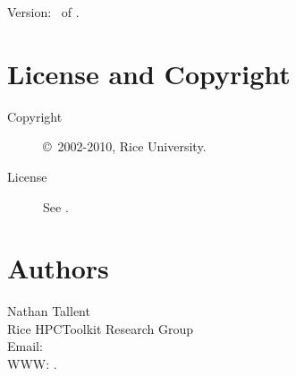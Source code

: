 \documentclass[english]{article}
\begin{document}
Version: \Version\ of \Date.

\section{License and Copyright}

\begin{description}
\item[Copyright] \copyright\ 2002-2010, Rice University.
\item[License] See .
\end{description}

\section{Authors}

\noindent
Nathan Tallent \\
Rice HPCToolkit Research Group \\
Email:  \\
WWW: .

\LatexManEnd
\end{document}

